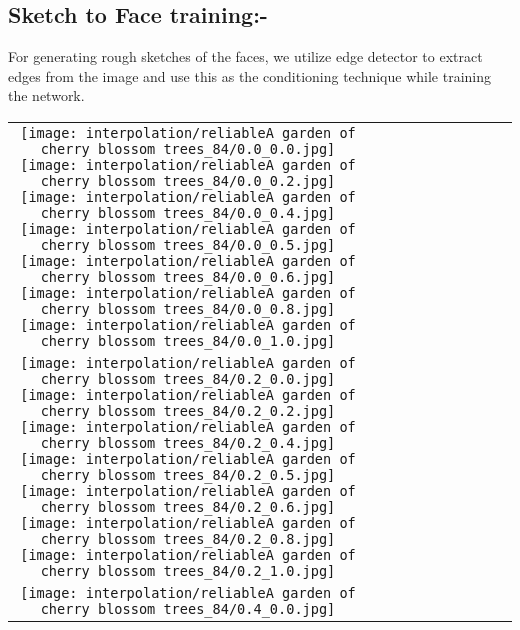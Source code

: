 \documentclass[10pt,twocolumn,letterpaper]{article}
\begin{document}
\subsection{Sketch to Face training:-}

For generating rough sketches of the faces, we utilize \cite{ding2001canny} edge detector to extract edges from the image and use this as the conditioning technique while training the network.
\begin{figure*}[tb!]
    \centering
    \setlength{\tabcolsep}{0.5pt}
    {\small
    \renewcommand{\arraystretch}{0.5} 
    \begin{tabular}{c c c c c c c c c c}
    \captionsetup{type=figure, font=scriptsize}
    \raisebox{0.1in}{\rotatebox{90}{\small \emph{}
 }}
  \texttt{[image: interpolation/reliableA garden of cherry blossom trees\_84/0.0\_0.0.jpg]}
  \texttt{[image: interpolation/reliableA garden of cherry blossom trees\_84/0.0\_0.2.jpg]}
  \texttt{[image: interpolation/reliableA garden of cherry blossom trees\_84/0.0\_0.4.jpg]}
  \texttt{[image: interpolation/reliableA garden of cherry blossom trees\_84/0.0\_0.5.jpg]}
  \texttt{[image: interpolation/reliableA garden of cherry blossom trees\_84/0.0\_0.6.jpg]}
  \texttt{[image: interpolation/reliableA garden of cherry blossom trees\_84/0.0\_0.8.jpg]}
  \texttt{[image: interpolation/reliableA garden of cherry blossom trees\_84/0.0\_1.0.jpg]}
 \tabularnewline
     \raisebox{0.1in}{\rotatebox{90}{\small \emph{}
 }}
  \texttt{[image: interpolation/reliableA garden of cherry blossom trees\_84/0.2\_0.0.jpg]}
  \texttt{[image: interpolation/reliableA garden of cherry blossom trees\_84/0.2\_0.2.jpg]}
  \texttt{[image: interpolation/reliableA garden of cherry blossom trees\_84/0.2\_0.4.jpg]}
  \texttt{[image: interpolation/reliableA garden of cherry blossom trees\_84/0.2\_0.5.jpg]}
  \texttt{[image: interpolation/reliableA garden of cherry blossom trees\_84/0.2\_0.6.jpg]}
  \texttt{[image: interpolation/reliableA garden of cherry blossom trees\_84/0.2\_0.8.jpg]}
  \texttt{[image: interpolation/reliableA garden of cherry blossom trees\_84/0.2\_1.0.jpg]}
\tabularnewline
    \raisebox{0.1in}{\rotatebox{90}{\small \emph{}
 }}
  \texttt{[image: interpolation/reliableA garden of cherry blossom trees\_84/0.4\_0.0.jpg]}

\end{tabular}}
\end{figure*}
\end{document}
